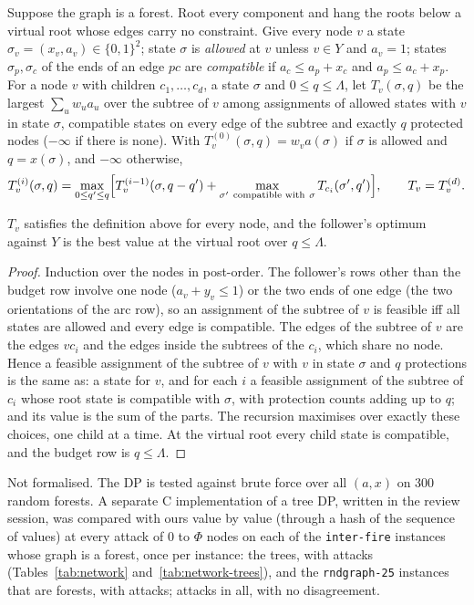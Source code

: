 Suppose the graph is a forest. Root every component and hang the roots below
a virtual root whose edges carry no constraint. Give every node $v$ a state
$\sigma_v=(x_v,a_v)\in\{0,1\}^2$; state $\sigma$ is \emph{allowed} at $v$ unless
$v\in Y$ and $a_v=1$; states $\sigma_p,\sigma_c$ of the ends of an edge $pc$ are
\emph{compatible} if $a_c\le a_p+x_c$ and $a_p\le a_c+x_p$. For a node $v$ with
children $c_1,\dots,c_d$, a state $\sigma$ and $0\le q\le\Lambda$, let
$T_v(\sigma,q)$ be the largest $\sum_uw_ua_u$ over the subtree of $v$ among
assignments of allowed states with $v$ in state $\sigma$, compatible states on
every edge of the subtree and exactly $q$ protected nodes ($-\infty$ if there
is none). With $T^{(0)}_v(\sigma,q)=w_va(\sigma)$ if $\sigma$ is allowed and
$q=x(\sigma)$, and $-\infty$ otherwise,
\[
  T^{(i)}_v(\sigma,q)=\max_{0\le q'\le q}\Bigl[T^{(i-1)}_v(\sigma,q-q')+
  \max_{\sigma'\ \text{compatible with}\ \sigma}T_{c_i}(\sigma',q')\Bigr],\qquad
  T_v=T^{(d)}_v .
\]

\begin{proposition}[Tree DP]\label{prop:fire-dp}
$T_v$ satisfies the definition above for every node, and the follower's
optimum against $Y$ is the best value at the virtual root over $q\le\Lambda$.
\end{proposition}
\begin{proof}
Induction over the nodes in post-order. The follower's rows other than the
budget row involve one node ($a_v+y_v\le 1$) or the two ends of one edge (the
two orientations of the arc row), so an assignment of the subtree of $v$ is
feasible iff all states are allowed and every edge is compatible. The edges
of the subtree of $v$ are the edges $vc_i$ and the edges inside the subtrees of
the $c_i$, which share no node. Hence a feasible assignment of the subtree of
$v$ with $v$ in state $\sigma$ and $q$ protections is the same as: a state for
$v$, and for each $i$ a feasible assignment of the subtree of $c_i$ whose root
state is compatible with $\sigma$, with protection counts adding up to $q$; and
its value is the sum of the parts. The recursion maximises over exactly these
choices, one child at a time. At the virtual root every child state is
compatible, and the budget row is $q\le\Lambda$.
\end{proof}
\noindent Not formalised. The DP is tested against brute force over all
$(a,x)$ on 300 random forests. A separate C implementation of a tree DP,
written in the review session, was compared with ours value by value (through
a hash of the sequence of values) at every attack of $0$ to $\Phi$ nodes on
each of the \SuppNetForests{} \texttt{inter-fire} instances whose graph is a
forest, once per instance: the \SuppNetTrees{} trees, with
\SuppNetTreeAttacks{} attacks (Tables~\ref{tab:network}
and~\ref{tab:network-trees}), and the \SuppNetRndForests{}
\texttt{rndgraph-25} instances that are forests, with
\SuppNetRndForestAttacks{} attacks; \SuppNetForestAttacks{} attacks in all,
with no disagreement.


